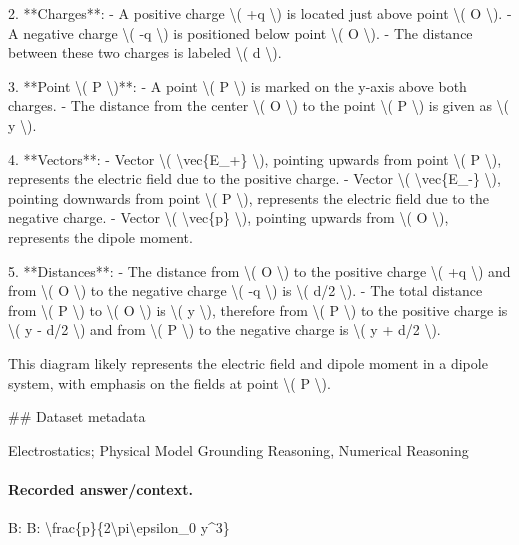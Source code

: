 2. **Charges**:
   - A positive charge \textbackslash{}( +q \textbackslash{}) is located just above point \textbackslash{}( O \textbackslash{}).
   - A negative charge \textbackslash{}( -q \textbackslash{}) is positioned below point \textbackslash{}( O \textbackslash{}).
   - The distance between these two charges is labeled \textbackslash{}( d \textbackslash{}).

3. **Point \textbackslash{}( P \textbackslash{})**:
   - A point \textbackslash{}( P \textbackslash{}) is marked on the y-axis above both charges.
   - The distance from the center \textbackslash{}( O \textbackslash{}) to the point \textbackslash{}( P \textbackslash{}) is given as \textbackslash{}( y \textbackslash{}).

4. **Vectors**:
   - Vector \textbackslash{}( \textbackslash{}vec\{E\_+\} \textbackslash{}), pointing upwards from point \textbackslash{}( P \textbackslash{}), represents the electric field due to the positive charge.
   - Vector \textbackslash{}( \textbackslash{}vec\{E\_-\} \textbackslash{}), pointing downwards from point \textbackslash{}( P \textbackslash{}), represents the electric field due to the negative charge.
   - Vector \textbackslash{}( \textbackslash{}vec\{p\} \textbackslash{}), pointing upwards from \textbackslash{}( O \textbackslash{}), represents the dipole moment.

5. **Distances**:
   - The distance from \textbackslash{}( O \textbackslash{}) to the positive charge \textbackslash{}( +q \textbackslash{}) and from \textbackslash{}( O \textbackslash{}) to the negative charge \textbackslash{}( -q \textbackslash{}) is \textbackslash{}( d/2 \textbackslash{}).
   - The total distance from \textbackslash{}( P \textbackslash{}) to \textbackslash{}( O \textbackslash{}) is \textbackslash{}( y \textbackslash{}), therefore from \textbackslash{}( P \textbackslash{}) to the positive charge is \textbackslash{}( y - d/2 \textbackslash{}) and from \textbackslash{}( P \textbackslash{}) to the negative charge is \textbackslash{}( y + d/2 \textbackslash{}).
  
This diagram likely represents the electric field and dipole moment in a dipole system, with emphasis on the fields at point \textbackslash{}( P \textbackslash{}).

\#\# Dataset metadata

Electrostatics; Physical Model Grounding Reasoning, Numerical Reasoning

\paragraph{Recorded answer/context.}
B: B: \textbackslash{}frac\{p\}\{2\textbackslash{}pi\textbackslash{}epsilon\_0 y\textasciicircum{}3\}

